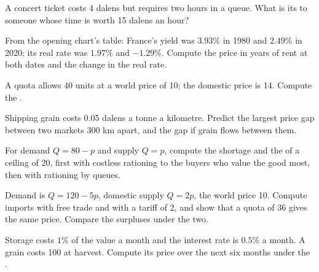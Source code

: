 \begin{exercise}[$\star$]\label{exo:b1:price-theory-at-work:full}
A concert ticket costs 4 dalens but requires two hours in a queue. What is
its  to someone whose time is worth 15 dalens an hour?
\end{exercise}

\begin{exercise}[$\star$]\label{exo:b1:price-theory-at-work:read}
From the opening chart's table: France's yield was $3.93\%$ in 1980 and
$2.49\%$ in 2020; its real rate was $1.97\%$ and $-1.29\%$. %
Compute the price in years of rent at both dates and the change in the
real rate.
\end{exercise}

\begin{exercise}[$\star$]\label{exo:b1:price-theory-at-work:quota-rent}
A quota allows 40 units at a world price of 10; the domestic price is 14.
Compute the .
\end{exercise}

\begin{exercise}[$\star$]\label{exo:b1:price-theory-at-work:distance}
Shipping grain costs 0.05 dalens a tonne a kilometre. Predict the largest
price gap between two markets 300 km apart, and the gap if grain flows
between them.
\end{exercise}

\begin{exercise}[$\star\star$]\label{exo:b1:price-theory-at-work:ceiling}
For demand $Q = 80 - p$ and supply $Q = p$, compute the shortage and the
 of a ceiling of 20, first with costless rationing to the
buyers who value the good most, then with rationing by queues.
\end{exercise}

\begin{exercise}[$\star\star$]\label{exo:b1:price-theory-at-work:tariff}
Demand is $Q = 120 - 5p$, domestic supply $Q = 2p$, the world price 10. Compute
imports with free trade and with a tariff of 2, and show that a quota of 36
gives the same price. Compare the surpluses under the two.
\end{exercise}

\begin{exercise}[$\star\star$]\label{exo:b1:price-theory-at-work:path}
Storage costs $1\%$ of the value a month and the interest rate is $0.5\%$ a
month. A grain costs 100 at harvest. Compute its price over the next six
months under the .
\end{exercise}

